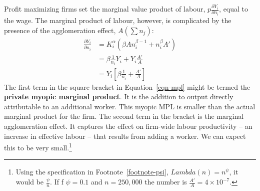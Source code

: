 
Profit maximizing firms  set the marginal value product of labour, $p\frac{\partial Y_i}{\partial n_i}$, equal to the wage. The marginal product of labour, however,  is complicated by the presence of the  agglomeration effect, $A(\sum n_j)$:
\begin{eqnarray} \frac{\partial Y_i}{\partial n_i} &=   K_i^\alpha \left(  \beta A n_i^{\beta-1}  + n_i^{\beta}A'  \right)  \nonumber\\
&=   \beta\frac{1}{n_i} Y_i   +  Y_i \frac{A'}{A}  \nonumber\\
&=   Y_i  \left[  \beta\frac{1}{n_i}  + \frac{A' }{A} \right]   \label{eqn-mpl}
\end{eqnarray}
The first term in the square bracket in Equation~\ref{eqn-mpl} might be termed the \textbf{private myopic marginal product}. It is the addition to output directly attributable to an additional worker. This myopic MPL is smaller than the actual marginal product for the firm.  
The second term in the bracket   is the marginal agglomeration effect. It captures the effect on firm-wide labour productivity -- an increase in effective labour --   that results from adding a worker. We can expect this to be very small.\footnote{Using the specification in Footnote~\ref{footnote-psi}, $Lambda(n)=n^\psi$, it would be $\frac{\psi}{n}$. If f $\psi=0.1$ and $n=250,000$ the number is $\frac{A' }{A} =4\times 10^{-7}$.}%


